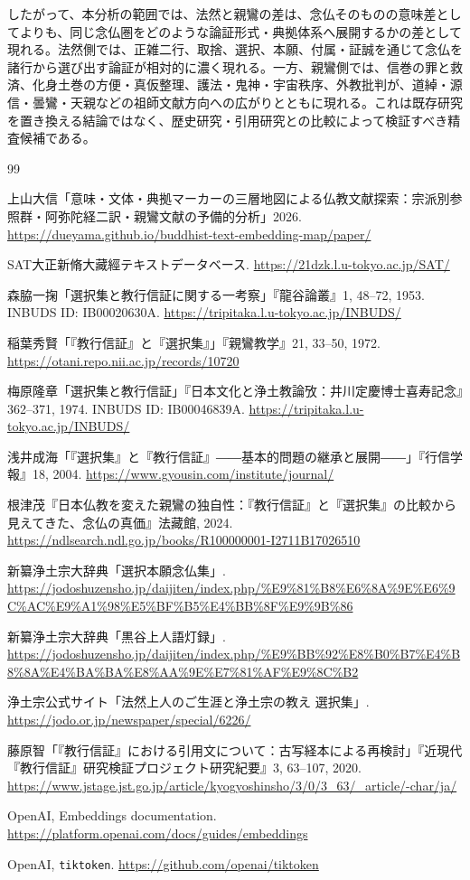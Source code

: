 \documentclass[uplatex,dvipdfmx,11pt,a4paper]{jsarticle}
\begin{document}
したがって、本分析の範囲では、法然と親鸞の差は、念仏そのものの意味差としてよりも、同じ念仏圏をどのような論証形式・典拠体系へ展開するかの差として現れる。法然側では、正雑二行、取捨、選択、本願、付属・証誠を通じて念仏を諸行から選び出す論証が相対的に濃く現れる。一方、親鸞側では、信巻の罪と救済、化身土巻の方便・真仮整理、護法・鬼神・宇宙秩序、外教批判が、道綽・源信・曇鸞・天親などの祖師文献方向への広がりとともに現れる。これは既存研究を置き換える結論ではなく、歴史研究・引用研究との比較によって検証すべき精査候補である。

\begin{thebibliography}{99}

上山大信「意味・文体・典拠マーカーの三層地図による仏教文献探索：宗派別参照群・阿弥陀経二訳・親鸞文献の予備的分析」2026.
\url{https://dueyama.github.io/buddhist-text-embedding-map/paper/}

SAT大正新脩大藏經テキストデータベース.
\url{https://21dzk.l.u-tokyo.ac.jp/SAT/}

森脇一掬「選択集と教行信証に関する一考察」『龍谷論叢』1, 48--72, 1953.
INBUDS ID: IB00020630A.
\url{https://tripitaka.l.u-tokyo.ac.jp/INBUDS/}

稲葉秀賢「『教行信証』と『選択集』」『親鸞教学』21, 33--50, 1972.
\url{https://otani.repo.nii.ac.jp/records/10720}

梅原隆章「選択集と教行信証」『日本文化と浄土教論攷：井川定慶博士喜寿記念』362--371, 1974.
INBUDS ID: IB00046839A.
\url{https://tripitaka.l.u-tokyo.ac.jp/INBUDS/}

浅井成海「『選択集』と『教行信証』――基本的問題の継承と展開――」『行信学報』18, 2004.
\url{https://www.gyousin.com/institute/journal/}

根津茂『日本仏教を変えた親鸞の独自性：『教行信証』と『選択集』の比較から見えてきた、念仏の真価』法藏館, 2024.
\url{https://ndlsearch.ndl.go.jp/books/R100000001-I2711B17026510}

新纂浄土宗大辞典「選択本願念仏集」.
\url{https://jodoshuzensho.jp/daijiten/index.php/%E9%81%B8%E6%8A%9E%E6%9C%AC%E9%A1%98%E5%BF%B5%E4%BB%8F%E9%9B%86}

新纂浄土宗大辞典「黒谷上人語灯録」.
\url{https://jodoshuzensho.jp/daijiten/index.php/%E9%BB%92%E8%B0%B7%E4%B8%8A%E4%BA%BA%E8%AA%9E%E7%81%AF%E9%8C%B2}

浄土宗公式サイト「法然上人のご生涯と浄土宗の教え 選択集」.
\url{https://jodo.or.jp/newspaper/special/6226/}

藤原智「『教行信証』における引用文について：古写経本による再検討」『近現代『教行信証』研究検証プロジェクト研究紀要』3, 63--107, 2020.
\url{https://www.jstage.jst.go.jp/article/kyogyoshinsho/3/0/3_63/_article/-char/ja/}

OpenAI, Embeddings documentation.
\url{https://platform.openai.com/docs/guides/embeddings}

OpenAI, \texttt{tiktoken}.
\url{https://github.com/openai/tiktoken}

\end{thebibliography}
\end{document}
